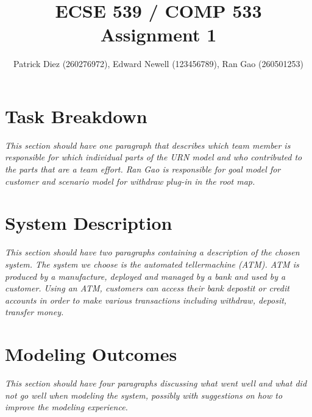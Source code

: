 \documentclass[10pt,fleqn]{article}
\title{ECSE 539 / COMP 533 Assignment 1}
\author{Patrick Diez (260276972), Edward Newell (123456789), Ran Gao (260501253)}
\begin{document}
\maketitle                              %


\section{Task Breakdown}
\textit{This section should have one paragraph that describes which team member is responsible for which individual parts of the URN model and who contributed to the parts that are a team effort.
Ran Gao is responsible for goal model for customer and scenario model for withdraw plug-in in the root map.}
%
\section{System Description}
\textit{This section should have two paragraphs containing a description of the chosen system.
The system we choose is the automated tellermachine (ATM). ATM is produced by a manufacture, deployed and managed by a bank and used by a customer. Using an ATM, customers can access their bank depostit or credit accounts in order to make various transactions including withdraw, deposit, transfer money.}
%
\section{Modeling Outcomes}
\textit{This section should have four paragraphs discussing what went well and what did not go well when modeling the system, possibly with suggestions on how to improve the modeling experience.}
\end{document}
